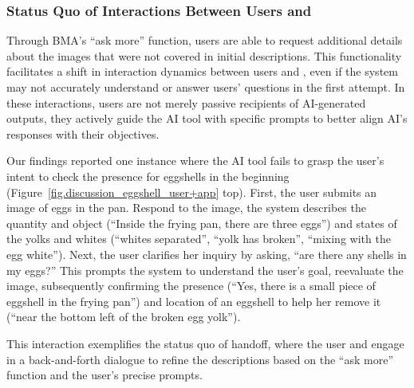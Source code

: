 \subsubsection{Status Quo of Interactions Between Users and \bma}


Through BMA's ``ask more'' function, users are able to request additional details about the images that were not covered in initial descriptions. 
% 
This functionality facilitates a shift in interaction dynamics between users and \bma, even if the system may not accurately understand or answer users' questions in the first attempt. 
In these interactions, users are not merely passive recipients of AI-generated outputs, they actively guide the AI tool with specific prompts to better align AI's responses with their objectives. 


Our findings reported one instance where the AI tool fails to grasp the user's intent to check the presence for eggshells in the beginning (Figure~\ref{fig.discussion_eggshell_user+app} top). First, the user submits an image of eggs in the pan. Respond to the image, the system describes the quantity and object (``Inside the frying pan, there are three eggs'') and states of the yolks and whites (``whites separated'', ``yolk has broken'', ``mixing with the egg white''). Next, the user clarifies her inquiry by asking, ``are there any shells in my eggs?''
This prompts the system to understand the user's goal, reevaluate the image, subsequently confirming the presence (``Yes, there is a small piece of eggshell in the frying pan'') and location of an eggshell to help her remove it (``near the bottom left of the broken egg yolk''). 


This interaction exemplifies the status quo of handoff, where the user and \bma{} engage in a back-and-forth dialogue to refine the descriptions based on the ``ask more'' function and the user's precise prompts. 
% 






